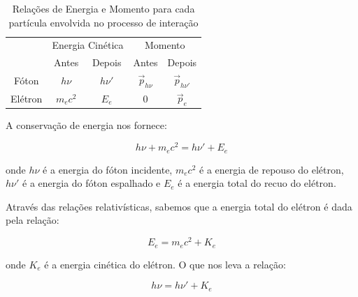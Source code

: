 \documentclass[11pt,a4paper]{article}
\begin{document}
            \begin{table}[h]
                \centering
                \caption{Relações de Energia e Momento para cada partícula envolvida no processo de interação}
                \label{tb:conservacaoEnergiaMomentoCompton}
                \begin{tabular}{c c c c c}
                    \hline
                    \addlinespace[5pt]
                    & \multicolumn{2}{c}{Energia Cinética} & \multicolumn{2}{c}{Momento} \\
                    \cline{2-5}
                    \addlinespace[5pt]
                    \multirow[c]{-2}{*}{Partícula} & Antes & Depois & Antes & Depois \\
                    \hline
                    \addlinespace[5pt]
                    Fóton & $h\nu$ & $h \nu'$ & $\vec{p}_{h\nu}$  & $\vec{p}_{h\nu'}$ \\
                    \addlinespace[5pt]
                    Elétron & $m_e c^2$ & $E_e$ & $0$ & $\vec{p}_e$ \\
                    \hline
                    \hline
                \end{tabular}
            \end{table}


            \noindent A conservação de energia nos fornece: 

            \begin{equation}
                h\nu + m_ec^2 = h \nu' + E_e
                \label{eq:conservacaoDeEnergiaCompton}
            \end{equation}

            \noindent onde $h\nu$ é a energia do fóton incidente, $m_ec^2$ é a energia de repouso do elétron, $h \nu'$ é a energia do fóton espalhado e $E_e$ é a energia total do recuo do elétron.

            \noindent Através das relações relativísticas, sabemos que a energia total do elétron é dada pela relação:

                \begin{equation}
                    E_e = m_e c^2 + K_e
                \end{equation}

            \noindent onde $K_e$ é a energia cinética do elétron. O que nos leva a relação:

                \begin{equation}
                    h \nu = h\nu' + K_e
                \end{equation}
\end{document}
